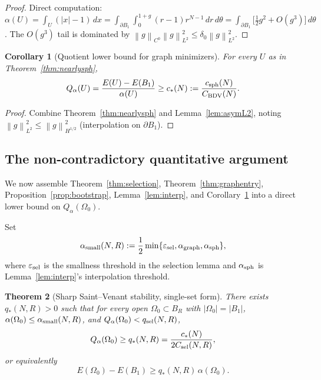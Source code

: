 \documentclass[11pt]{amsart}
\newtheorem{theorem}{Theorem}[section]
\newtheorem{corollary}[theorem]{Corollary}
\theoremstyle{definition}
\newcommand{\norm}[1]{\left\|#1\right\|}
\newcommand{\abs}[1]{\left|#1\right|}
\renewcommand{\d}{\,d}
\begin{document}
\begin{proof}
Direct computation: $\alpha(U)=\int_U(\abs{x}-1)\d x=
\int_{\partial B_1}\int_0^{1+g}(r-1)r^{N-1}\d r\d\theta
=\int_{\partial B_1}\bigl[\tfrac12 g^2+O(g^3)\bigr]\d\theta$.
The $O(g^3)$ tail is dominated by $\norm{g}_{C^0}\norm{g}_{L^2}^2\le\delta_0\norm{g}_{L^2}^2$.
\end{proof}

\begin{corollary}[Quotient lower bound for graph minimizers]\label{cor:Qlower}
For every $U$ as in Theorem~\ref{thm:nearlysph},
\[
Q_\alpha(U)=\frac{E(U)-E(B_1)}{\alpha(U)}\ge c_*(N):=\frac{c_{\rm sph}(N)}{C_{\rm BDV}(N)}.
\]
\end{corollary}

\begin{proof}
Combine Theorem~\ref{thm:nearlysph} and Lemma~\ref{lem:asymL2}, noting
$\norm{g}_{L^2}^2\le\norm{g}_{H^{1/2}}^2$ (interpolation on $\partial B_1$).
\end{proof}

\subsection{The non-contradictory quantitative argument}\label{sec:argument}

We now assemble Theorem~\ref{thm:selection}, Theorem~\ref{thm:graphentry},
Proposition~\ref{prop:bootstrap}, Lemma~\ref{lem:interp}, and
Corollary~\ref{cor:Qlower} into a direct lower bound on
$Q_\alpha(\Omega_0)$.

Set
\[
\alpha_{\rm small}(N,R):=\frac12\min\{\varepsilon_{\rm sel},\alpha_{\rm graph},
\alpha_{\rm sph}\},
\]
where $\varepsilon_{\rm sel}$ is the smallness threshold in the selection
lemma and $\alpha_{\rm sph}$ is Lemma~\ref{lem:interp}'s interpolation
threshold.

\begin{theorem}[Sharp Saint--Venant stability, single-set form]\label{thm:sv-sharp}
There exists $q_*(N,R)>0$ such that for every open
$\Omega_0\subset B_R$ with $\abs{\Omega_0}=\abs{B_1}$,
$\alpha(\Omega_0)\le \alpha_{\rm small}(N,R)$, and
$Q_\alpha(\Omega_0)<q_{\rm sel}(N,R)$,
\[
Q_\alpha(\Omega_0)\ge q_*(N,R)=\frac{c_*(N)}{2C_{\rm sel}(N,R)},
\]
or equivalently
\[
E(\Omega_0)-E(B_1)\ge q_*(N,R)\,\alpha(\Omega_0).
\]
\end{theorem}
\end{document}
